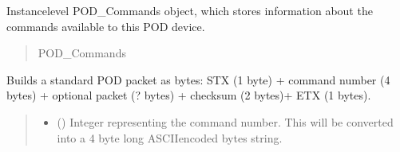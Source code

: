 \documentclass[letterpaper,10pt,english]{sphinxmanual}
\begin{document}
\begin{fulllineitems}

\begin{fulllineitems}
\label{\detokenize{PodApi.Devices:PodApi.Devices.BasicPodProtocol.Pod._commands}}
\pysigstartsignatures
{}
\pysigstopsignatures
\sphinxAtStartPar
Instance\sphinxhyphen{}level POD\_Commands object, which stores information about             the commands available to this POD device.
\begin{quote}\begin{description}
\sphinxAtStartPar
POD\_Commands

\end{description}\end{quote}

\end{fulllineitems}


\begin{fulllineitems}
\label{\detokenize{PodApi.Devices:PodApi.Devices.BasicPodProtocol.Pod.BuildPODpacket_Standard}}
\pysigstartsignatures
{}
\pysigstopsignatures
\sphinxAtStartPar
Builds a standard POD packet as bytes: STX (1 byte) + command number (4 bytes)         + optional packet (? bytes) + checksum (2 bytes)+ ETX (1 bytes).
\begin{quote}\begin{description}
\begin{itemize}
\item {} 
\sphinxAtStartPar
{} () \textendash{} Integer representing the command number. This will be converted into                 a 4 byte long ASCII\sphinxhyphen{}encoded bytes string.


\end{itemize}
\end{description}
\end{quote}
\end{fulllineitems}
\end{fulllineitems}
\end{document}

